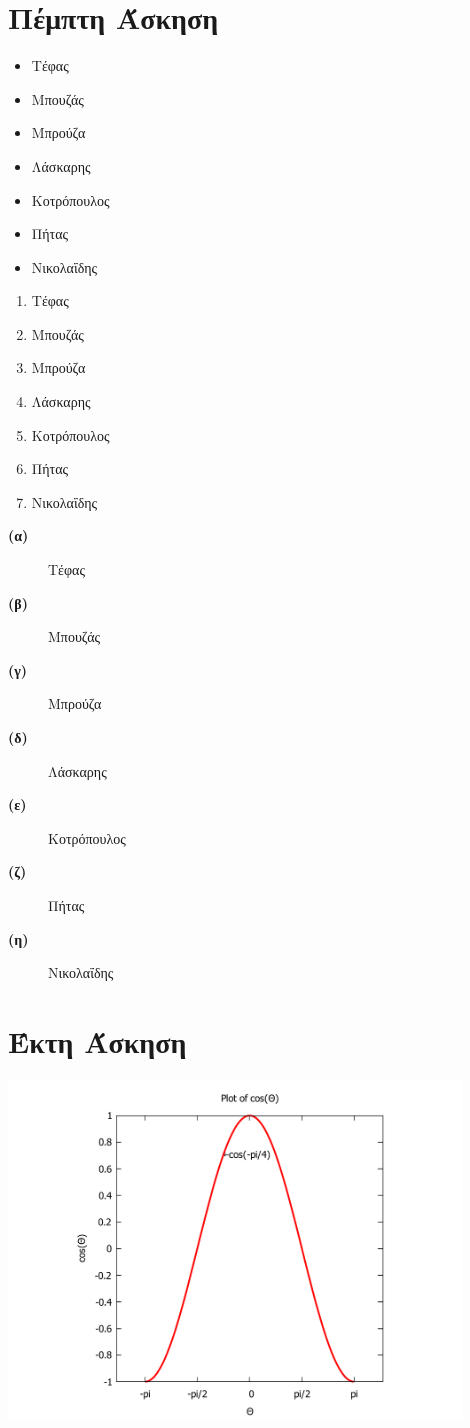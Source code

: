 \documentclass[a4paper,11pt]{article}
\begin{document}
\vspace*{2 cm}

\section{Πέμπτη Άσκηση}
	\vspace*{1 cm}
\it{
\begin{itemize}
   \item Τέφας
   \item Μπουζάς
   \item Μπρούζα
   \item Λάσκαρης
   \item Κοτρόπουλος
   \item Πήτας
   \item Νικολαΐδης
\end{itemize}
\begin{enumerate}
   \item Τέφας
   \item Μπουζάς
   \item Μπρούζα
   \item Λάσκαρης
   \item Κοτρόπουλος
   \item Πήτας
   \item Νικολαΐδης
\end{enumerate}
\begin{description}
   \item[\bf{(α)}] Τέφας
   \item[\bf{(β)}] Μπουζάς
   \item[\bf{(γ)}] Μπρούζα
   \item[\bf{(δ)}] Λάσκαρης
   \item[\bf{(ε)}] Κοτρόπουλος
   \item[\bf{(ζ)}] Πήτας
   \item[\bf{(η)}] Νικολαΐδης
\end{description}
}

\section{Έκτη Άσκηση}

\includegraphics[height=9cm, width=12cm]{cos(th).pdf}
\end{document}
